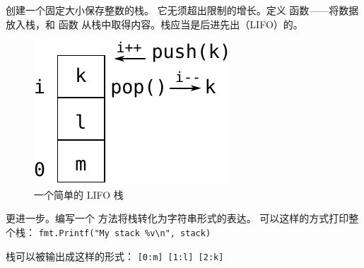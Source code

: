 \begin{Exercise}[title={栈},difficulty=5]
\label{ex:stack}
\Question \label{ex:stack q1} 创建一个固定大小保存整数的栈。
它无须超出限制的增长。定义  函数——将数据放入栈，和  函数
从栈中取得内容。栈应当是后进先出（LIFO）的。

\begin{figure}[H]
\caption{一个简单的 LIFO 栈}
\label{fig:stack}
\begin{center}
\includegraphics[scale=0.65]{fig/stack.pdf}
\end{center}
\end{figure}

\Question \label{ex:stack q2} 更进一步。编写一个  方法将栈转化为字符串形式的表达。
可以这样的方式打印整个栈：
\lstinline{fmt.Printf("My stack %v\n", stack)}

\noindent{}栈可以被输出成这样的形式：
\texttt{[0:m] [1:l] [2:k]}

\end{Exercise}

